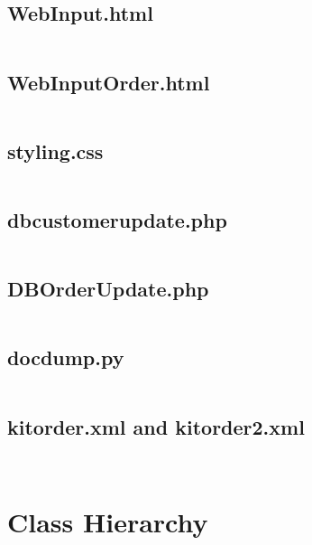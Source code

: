 \documentclass[
11pt, %
a4paper, %
oneside, %
headinclude,footinclude, %
BCOR5mm, %
]{scrartcl}
\begin{document}
\begin{appendices}
\subsection{WebInput.html}
\inputminted[linenos, breaklines]{html}{/Users/tsmoffat/kitordersystem/kitordersystem/kitordersystem/WebInput.html}
\subsection{WebInputOrder.html}
\inputminted[linenos, breaklines]{html}{/Users/tsmoffat/kitordersystem/kitordersystem/kitordersystem/WebInputOrder.html}
\subsection{styling.css}
\inputminted[linenos, breaklines]{CSS}{/Users/tsmoffat/kitordersystem/kitordersystem/kitordersystem/styling.css}
\subsection{dbcustomerupdate.php}
\inputminted[linenos, breaklines]{php}{/Users/tsmoffat/kitordersystem/kitordersystem/kitordersystem/dbcustomerupdate.php}
\subsection{DBOrderUpdate.php}
\inputminted[linenos, breaklines]{php}{/Users/tsmoffat/kitordersystem/kitordersystem/kitordersystem/DBOrderUpdate.php}
\subsection{docdump.py}
\inputminted[linenos, breaklines]{python}{/Users/tsmoffat/kitordersystem/kitordersystem/kitordersystem/docdump.py}
\subsection{kitorder.xml and kitorder2.xml}
\inputminted[linenos, breaklines]{XML}{/Users/tsmoffat/kitordersystem/kitordersystem/kitordersystem/kitorder.xml}
\inputminted[linenos, breaklines]{XML}{/Users/tsmoffat/kitordersystem/kitordersystem/kitordersystem/kitorder2.xml}
\restoregeometry
\section*{Class Hierarchy}{
\thispagestyle{empty}
}
\end{appendices}
\end{document}
